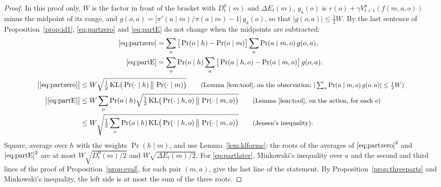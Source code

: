 \documentclass{article}
\theoremstyle{definition}
\numberwithin{equation}{section}
\newcommand{\KL}{\mathrm{KL}}
\newcommand{\dE}{\Delta E}
\newcommand{\why}[1]{\tag*{\small(#1)}}
\begin{document}
\begin{proof}
In this proof only, $W$ is the factor in front of the bracket with $D^0_t(m)$ and $\dE_t(m)$, $y_a(o)$ is $r(o)+\gamma V^\pi_{t+1}(f(m,a,o))$ minus the midpoint of its range, and $g(o,a)=\big[\pi'(a\mid m)/\pi(a\mid m)-1\big]\,y_a(o)$, so that $|g(o,a)|\le\tfrac12W$. By the last sentence of Proposition~\ref{prop:id1}, \eqref{eq:partzero} and \eqref{eq:partE} do not change when the midpoints are subtracted:
\begin{align*}
\eqref{eq:partzero}&=\sum_o\big[\Pr(o\mid h)-\Pr(o\mid m)\big]\sum_a\Pr(a\mid m,o)\,g(o,a),\\
\eqref{eq:partE}&=\sum_o\Pr(o\mid h)\sum_a\big[\Pr(a\mid h,o)-\Pr(a\mid m,o)\big]\,g(o,a).
\end{align*}
\begin{align*}
\big|\eqref{eq:partzero}\big|&\le W\sqrt{\tfrac12\,\KL\big(\Pr(\cdot\mid h)\,\big\|\,\Pr(\cdot\mid m)\big)} \why{Lemma~\ref{lem:tool}, on the observation; $|\sum_a\Pr(a\mid m,o)\,g(o,a)|\le\tfrac12W$}\\
\big|\eqref{eq:partE}\big|&\le W\sum_o\Pr(o\mid h)\sqrt{\tfrac12\,\KL\big(\Pr(\cdot\mid h,o)\,\big\|\,\Pr(\cdot\mid m,o)\big)} \why{Lemma~\ref{lem:tool}, on the action, for each $o$}\\
&\le W\sqrt{\tfrac12\sum_o\Pr(o\mid h)\,\KL\big(\Pr(\cdot\mid h,o)\,\big\|\,\Pr(\cdot\mid m,o)\big)} \why{Jensen's inequality}.
\end{align*}
Square, average over $h$ with the weights $\Pr(h\mid m)$, and use Lemma~\ref{lem:klforms}: the roots of the averages of $\eqref{eq:partzero}^2$ and $\eqref{eq:partE}^2$ are at most $W\sqrt{D^0_t(m)/2}$ and $W\sqrt{\dE_t(m)/2}$. For \eqref{eq:partlater}, Minkowski's inequality over $a$ and the second and third lines of the proof of Proposition~\ref{prop:eval}, for each pair $(m,a)$, give the last line of the statement. By Proposition~\ref{prop:threeparts} and Minkowski's inequality, the left side is at most the sum of the three roots.
\end{proof}
\end{document}
